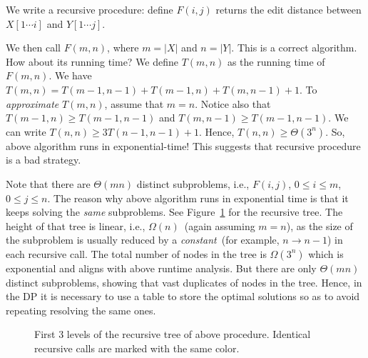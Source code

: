 We write a recursive procedure: define $F(i,j)$
returns the edit distance between $X[1\cdots i]$ and $Y[1\cdots j]$.

\begin{algorithmblock}[0.8\textwidth]
	\xxx
	\xxx
	\xxx
	\xxx
	\xxx
	\xxx
	\xxx
\end{algorithmblock}

We then call $F(m,n)$, where $m=|X|$ and $n=|Y|$.
This is a correct algorithm.
How about its running time?
We define $T(m,n)$ as the running time of $F(m,n)$.
We have $T(m,n) = T(m-1,n-1) + T(m-1,n) + T(m,n-1) + 1$.
To \emph{approximate} $T(m,n)$, assume that $m=n$.
Notice also that $T(m-1,n) \ge T(m-1,n-1)$
and $T(m,n-1) \ge T(m-1,n-1)$.
We can write $T(n,n) \ge 3T(n-1,n-1) + 1$.
Hence, $T(n,n) \ge \Theta(3^n)$.
So, above algorithm runs in exponential-time!
This suggests that recursive procedure is a bad strategy.

Note that there are $\Theta(mn)$ distinct subproblems, i.e., $F(i,j)$, $0\le i
\le m$, $0\le j \le n$. The reason why above
algorithm runs in exponential time is that it keeps solving the \emph{same}
subproblems. See Figure~\ref{fig:search-tree} for the recursive tree. 
The height of that tree is linear, i.e., $\Omega(n)$~(again assuming $m=n$), as
the size of the subproblem is usually reduced by a \emph{constant}~(for example, $n\to n-1$) in each recursive call.
The total number of nodes in the tree is $\Omega(3^n)$ which is exponential
and aligns with above runtime analysis.
But there are only $\Theta(mn)$ distinct subproblems, showing that
vast duplicates of nodes in the tree.
Hence, in the DP it is necessary to use a table to store the optimal solutions so as to avoid
repeating resolving the same ones.

\begin{figure}[h]
\centering{}
\caption{First 3 levels of the recursive tree of above procedure.
Identical recursive calls are marked with the same color.}
\label{fig:search-tree}
\end{figure}





